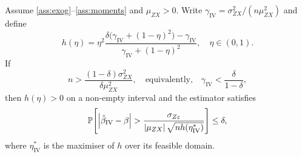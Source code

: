 \begin{theorem}
\label{thm:iv_cantelli}
    Assume \ref{ass:exog}--\ref{ass:moments} and $\mu_{ZX}>0$. Write $\gamma_{\mathrm{IV}} = \sigma_{ZX}^2/(n\mu_{ZX}^2)$ and define
    \begin{equation}
    \label{eq:h_eta_iv}
        h(\eta) = \eta^2
        \frac{\delta\bigl(\gamma_{\mathrm{IV}}+(1-\eta)^2\bigr)-\gamma_{\mathrm{IV}}}
            {\gamma_{\mathrm{IV}}+(1-\eta)^2},
        \quad \eta\in(0,1).
    \end{equation}
    If
    \begin{equation}
    \label{eq:iv_cantelli_strength}
        n > \frac{(1-\delta)\sigma_{ZX}^2}{\delta\mu_{ZX}^2}, \quad\text{equivalently,}\quad \gamma_{\mathrm{IV}} < \frac{\delta}{1-\delta},
    \end{equation}
    then $h(\eta)>0$ on a non-empty interval and the estimator satisfies
    \begin{equation}
    \label{eq:iv_cantelli_bound}
        \operatorname{\mathbb{P}}\!\left[\left|\hat{\beta}_{\mathrm{IV}} - \beta\right|
            > \frac{\sigma_{Z\varepsilon}}{\left|\mu_{ZX}\right|\sqrt{nh(\eta^*_{\mathrm{IV}})}}
            \right] \leq \delta,
    \end{equation}
    where $\eta^*_{\mathrm{IV}}$ is the maximiser of $h$ over its feasible domain.
\end{theorem}

